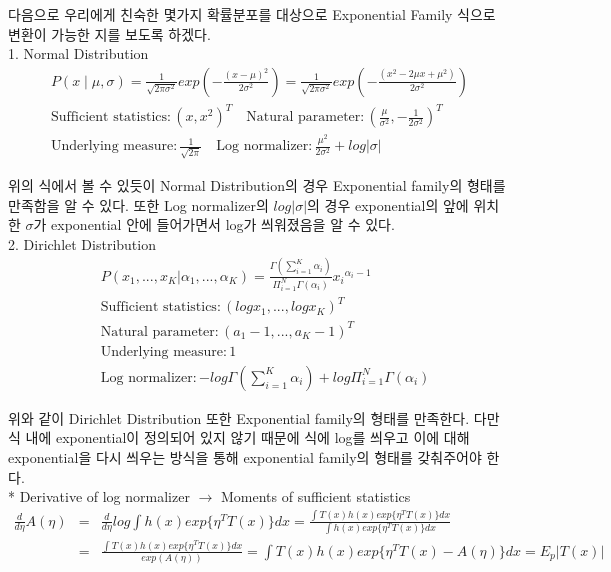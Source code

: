 \documentclass[draft=false]{oblivoir}
\begin{document}
다음으로 우리에게 친숙한 몇가지 확률분포를 대상으로 Exponential Family 식으로 변환이 가능한 지를 보도록 하겠다. \\

1. Normal Distribution
\begin{gather*}
P(x\mid \mu,\sigma) = \frac{1}{\sqrt{2\pi\sigma^2}}exp(-\frac{(x-\mu)^2}{2\sigma^2})=\frac{1}{\sqrt{2\pi\sigma^2}}exp(-\frac{(x^2-2\mu x+\mu^2)}{2\sigma^2})\nonumber\\
\text{Sufficient statistics} : {(x,x^2)}^T \quad
\text{Natural parameter} : {(\frac{\mu}{\sigma^2},-\frac{1}{2\sigma^2})}^T\\
\text{Underlying measure} : \frac{1}{\sqrt{2\pi}} \quad
\text{Log normalizer} : \frac{\mu^2}{2\sigma^2}+log|\sigma|
\end{gather*}

위의 식에서 볼 수 있듯이 Normal Distribution의 경우 Exponential family의 형태를 만족함을 알 수 있다. 또한 Log normalizer의 $log|\sigma|$의 경우 exponential의 앞에 위치한 $\sigma$가 exponential 안에 들어가면서 log가 씌워졌음을 알 수 있다. \\

2. Dirichlet Distribution
\begin{eqnarray*}
&P(x_{1},...,x_{K}|\alpha_{1},...,\alpha_{K}) = \frac{\Gamma(\sum^{K}_{i=1}\alpha_{i})}{\Pi^{N}_{i=1}\Gamma(\alpha_{i})}{x_{i}}^{\alpha_{i}-1}\nonumber  \\
&\text{Sufficient statistics} : {(logx_{1},...,logx_{K})}^T\nonumber\\
&\text{Natural parameter} : {(a_{1}-1,...,a_{K}-1)}^T\nonumber\\
&\text{Underlying measure} : 1\nonumber\\
&\text{Log normalizer} : -log\Gamma(\sum^{K}_{i=1}\alpha_{i})+log\Pi^{N}_{i=1}\Gamma(\alpha_{i})\nonumber
\label{eq:11-2-11-12}
\end{eqnarray*}

위와 같이 Dirichlet Distribution 또한 Exponential family의 형태를 만족한다. 다만 식 내에 exponential이 정의되어 있지 않기 때문에 식에 log를 씌우고 이에 대해 exponential을 다시 씌우는 방식을 통해 exponential family의 형태를 갖춰주어야 한다. \\

* Derivative of log normalizer $\rightarrow$ Moments of sufficient statistics\\

\begin{eqnarray}
\frac{d}{d\eta}A(\eta) & = & 
\frac{d}{d\eta}log\int h(x)exp\{\eta^{T}T(x)\}dx = \frac{\int T(x)h(x)exp\{\eta^{T}T(x)\}dx}{\int h(x)exp\{\eta^{T}T(x)\}dx}\nonumber\\
& = & \frac{\int T(x)h(x)exp\{\eta^{T}T(x)\}dx}{exp(A(\eta))}=\int T(x)h(x)exp\{\eta^{T}T(x)-A(\eta)\}dx = E_{p}|T(x)|\nonumber\\
\label{eq:Q()11-2-5-8}
\end{eqnarray}
\end{document}
